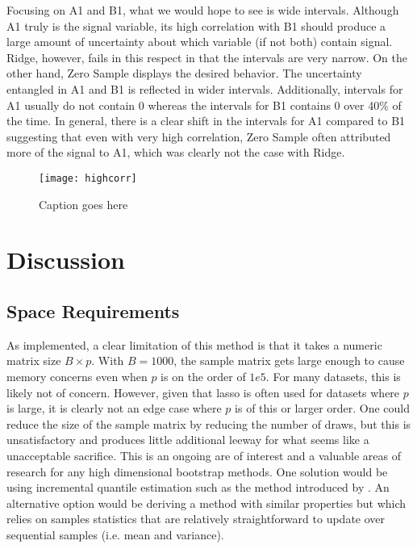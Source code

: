Focusing on A1 and B1, what we would hope to see is wide intervals. Although A1 truly is the signal variable, its high correlation with B1 should produce a large amount of uncertainty about which variable (if not both) contain signal. Ridge, however, fails in this respect in that the intervals are very narrow. On the other hand, Zero Sample displays the desired behavior. The uncertainty entangled in A1 and B1 is reflected in wider intervals. Additionally, intervals for A1 usually do not contain 0 whereas the intervals for B1 contains 0 over 40\% of the time. In general, there is a clear shift in the intervals for A1 compared to B1 suggesting that even with very high correlation, Zero Sample often attributed more of the signal to A1, which was clearly not the case with Ridge.

\begin{figure}
  \texttt{[image: highcorr]}
  \caption{\label{Fig:highcorr} Caption goes here}
\end{figure}

\section{Discussion}

\subsection{Space Requirements}

As implemented, a clear limitation of this method is that it takes a numeric matrix size $B \times p$. With $B = 1000$, the sample matrix gets large enough to cause memory concerns even when $p$ is on the order of $1e5$. For many datasets, this is likely not of concern. However, given that lasso is often used for datasets where $p$ is large, it is clearly not an edge case where $p$ is of this or larger order. One could reduce the size of the sample matrix by reducing the number of draws, but this is unsatisfactory and produces little additional leeway for what seems like a unacceptable sacrifice. This is an ongoing are of interest and a valuable areas of research for any high dimensional bootstrap methods. One solution would be using incremental quantile estimation such as the method introduced by \cite{Tierney1983}. An alternative option would be deriving a method with similar properties but which relies on samples statistics that are relatively straightforward to update over sequential samples (i.e. mean and variance).


